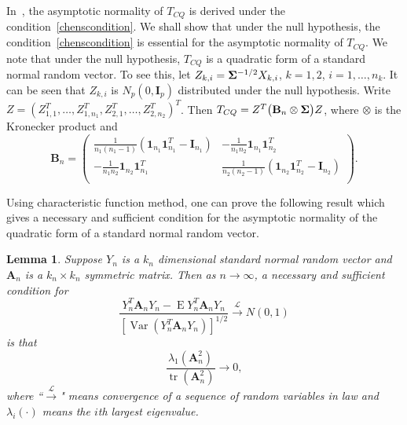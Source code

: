 \documentclass[review]{elsarticle}
\DeclareMathOperator{\mytr}{tr}
\DeclareMathOperator{\myE}{E}
\DeclareMathOperator{\myVar}{Var}
\newcommand{\BA}{\mathbf{A}}    \newcommand{\BB}{\mathbf{B}}    \newcommand{\BC}{\mathbf{C}}    \newcommand{\BD}{\mathbf{D}}    \newcommand{\BE}{\mathbf{E}}    \newcommand{\BF}{\mathbf{F}}    \newcommand{\BG}{\mathbf{G}}    \newcommand{\BH}{\mathbf{H}}    \newcommand{\BI}{\mathbf{I}}    \newcommand{\BJ}{\mathbf{J}}    \newcommand{\BK}{\mathbf{K}}    \newcommand{\BL}{\mathbf{L}}
\theoremstyle{plain}
\newtheorem{lemma}{\quad\quad Lemma}
\theoremstyle{definition}
\theoremstyle{remark}
\begin{document}
    In~\cite{Chen2010A}, the asymptotic normality of $T_{CQ}$ is derived under the condition~\eqref{chenscondition}.
    We shall show that under the null hypothesis, the condition~\eqref{chenscondition} is essential for the asymptotic normality of $T_{CQ}$.
We note that under the null hypothesis, $T_{CQ}$ is a quadratic form of a standard normal random vector.
To see this,
let $Z_{k,i}=\boldsymbol{\Sigma}^{-1/2}X_{k,i}$, $k=1,2$, $i=1,\ldots,n_k$.
It can be seen that $Z_{k,i}$ is $ N_p(0,\BI_{p})$ distributed under the null hypothesis.
Write $Z=(Z_{1,1}^T,\ldots,Z_{1,n_1}^T,Z_{2,1}^T,\ldots,Z_{2,n_2}^T)^T$.
    Then 
        $
        T_{CQ}=Z^T \big( \BB_n\otimes \bSigma \big) Z
        $,
    where $\otimes$ is the Kronecker product and
    \begin{equation*}
        \BB_n=\begin{pmatrix}
            \frac{1}{n_1(n_1-1)}(\mathbf{1}_{n_1} \mathbf{1}_{n_1}^T-\BI_{n_1})&
            -\frac{1}{n_1 n_2}\mathbf{1}_{n_1} \mathbf{1}_{n_2}^T\\
            -\frac{1}{n_1 n_2}\mathbf{1}_{n_2} \mathbf{1}_{n_1}^T&
            \frac{1}{n_2(n_2-1)}( \mathbf{1}_{n_2} \mathbf{1}_{n_2}^T-\BI_{n_2})\\
        \end{pmatrix}.
    \end{equation*}
    
Using characteristic function method, one can prove the following result which gives a necessary and sufficient condition for the asymptotic normality of the quadratic form of a standard normal random vector.
\begin{lemma}\label{quadraticFormCLT}
    Suppose $Y_{n}$ is a $k_n$ dimensional standard normal random vector and $\BA_n$ is a $k_n\times k_n$ symmetric matrix. Then as $n\to \infty$, a necessary and sufficient condition for
    \begin{equation}\label{quadratic}
        \frac{Y_n^T \BA_n Y_n-\myE Y_n^T \BA_n Y_n}{{[\myVar (Y_n^T \BA_n Y_n)]}^{1/2}}\xrightarrow{\mathcal{L}}N(0,1)
    \end{equation}
    is that
    \begin{equation}\label{quadraticEigen}
        \frac{\lambda_{1}(\BA_n^2)}{\mytr(\BA_n^2)}\to 0,
    \end{equation}
    where ``$\xrightarrow{\mathcal{L}}$" means convergence of a sequence of random variables in law and $\lambda_{i}(\cdot)$ means the $i$th largest eigenvalue.
\end{lemma}
\end{document}

